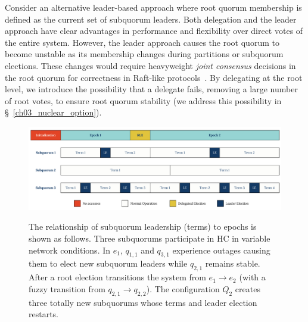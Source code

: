 Consider an alternative leader-based approach where root quorum membership is defined as the current set of subquorum leaders.
Both delegation and the leader approach have clear advantages in performance and flexibility over direct votes of the entire system.
However, the leader approach causes the root quorum to become unstable as its membership changes during partitions or subquorum elections.
These changes would require heavyweight \emph{joint consensus} decisions in the root quorum for correctness in Raft-like protocols~\cite{raft}.
By delegating at the root level, we introduce the possibility that a delegate fails, removing a large number of root votes, to ensure root quorum stability (we address this possibility in \S~\ref{ch03_nuclear_option}).


\begin{landscape}
\begin{figure}
    \begin{center}
        \includegraphics[width=8.2in]{figures/ch03_epochs_terms.pdf}
    \end{center}
    \renewcommand{\baselinestretch}{1}
    \small\normalsize

    \begin{quote}
        \caption[Ordering of Epochs and Terms in Root and Subquorums]{The relationship of subquorum leadership (terms) to epochs is shown as follows. Three subquorums participate in HC in variable network conditions. In $e_1$, $q_{1,1}$ and $q_{3,1}$ experience outages causing them to elect new subquorum leaders while $q_{2,1}$ remains stable. After a root election transitions the system from $e_1 \rightarrow e_2$ (with a fuzzy transition from $q_{2,1} \rightarrow q_{2,2}$). The configuration $Q_2$ creates three totally new subquorums whose terms and leader election restarts.}
        \label{fig:ch03_epochs_terms}
    \end{quote}
\end{figure}
\renewcommand{\baselinestretch}{2}
\small\normalsize
\end{landscape}

